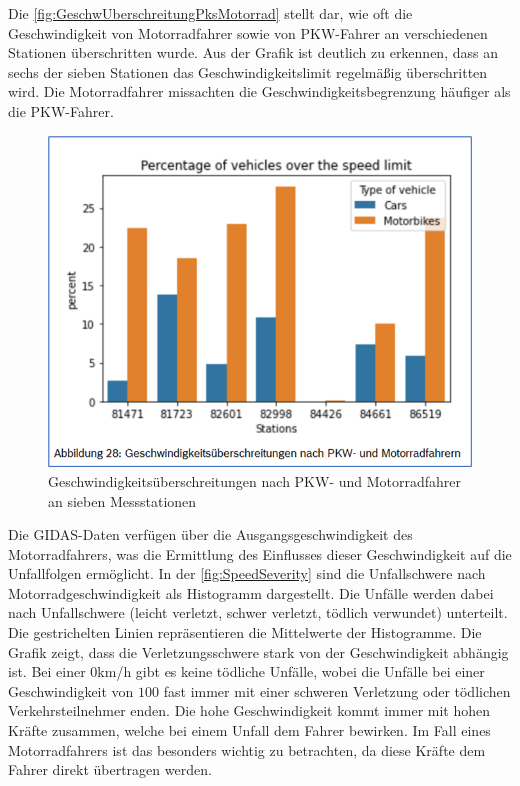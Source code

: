 Die \autoref{fig:GeschwUberschreitungPksMotorrad} stellt dar, wie oft die Geschwindigkeit von Motorradfahrer sowie von PKW-Fahrer an verschiedenen Stationen überschritten wurde. Aus der Grafik ist deutlich zu erkennen, dass an sechs der sieben Stationen das Geschwindigkeitslimit regelmäßig überschritten wird.
Die Motorradfahrer missachten die Geschwindigkeitsbegrenzung häufiger als die PKW-Fahrer. \citep{Maire2020}


\begin{figure}[H]
	\centering
	\includegraphics[width=\linewidth]{Bilder/GeschwUberschreitungPksMotorrad.png}
	\caption{Geschwindigkeitsüberschreitungen nach PKW- und Motorradfahrer an sieben Messstationen\citep{Maire2020}}
	\label{fig:GeschwUberschreitungPksMotorrad}
\end{figure}
Die GIDAS-Daten verfügen über die Ausgangsgeschwindigkeit des Motorradfahrers, was die Ermittlung des Einflusses dieser Geschwindigkeit auf die Unfallfolgen ermöglicht. In der \autoref{fig:SpeedSeverity} sind die Unfallschwere nach Motorradgeschwindigkeit als Histogramm dargestellt. Die Unfälle werden dabei nach Unfallschwere (leicht verletzt, schwer verletzt, tödlich verwundet) unterteilt. Die gestrichelten Linien repräsentieren die Mittelwerte der Histogramme.
Die Grafik zeigt, dass die Verletzungsschwere stark von der Geschwindigkeit abhängig ist. Bei einer $0$km/h gibt es keine tödliche Unfälle, wobei die Unfälle bei einer Geschwindigkeit von $100$ fast immer mit einer schweren Verletzung oder tödlichen Verkehrsteilnehmer enden. Die hohe Geschwindigkeit kommt immer mit hohen Kräfte zusammen, welche bei einem Unfall dem Fahrer bewirken. Im Fall eines Motorradfahrers ist das besonders wichtig zu betrachten, da diese Kräfte dem Fahrer direkt übertragen werden. \citep{Maire2020} %


